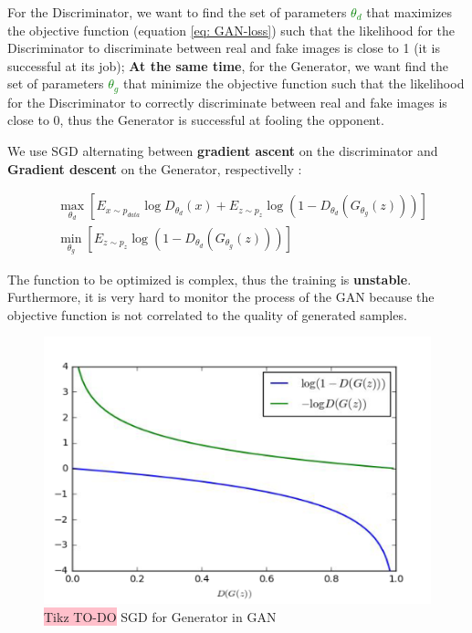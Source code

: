 For the Discriminator, we want to find the set of parameters 
\textcolor{green}{$\theta_{d}$} that maximizes the objective function (equation \ref{eq: GAN-loss}) such that the likelihood for the Discriminator to discriminate between real and fake images is close to 1 (it is successful at its job); \textbf{At the same time}, for the Generator, we want find the set of parameters 
\textcolor{green}{$\theta_{g}$} that minimize the objective function such that the likelihood for the Discriminator to correctly discriminate between real and fake images is close to 0, thus the Generator is successful at fooling the opponent.


We use SGD alternating between \textbf{gradient ascent} on the discriminator and \textbf{Gradient descent} on the Generator, respectivelly :

\begin{equation}
\begin{aligned}
    &\max_{\theta_{d}} \left[E_{x \sim p_{data}} \log D_{\theta_{d}}(x) + E_{z \sim p_{z}} \log (1 - D_{\theta_{d}}(G_{\theta_{g}}(z))) \right] \\
    &\min_{\theta_{g}} \left[E_{z \sim p_{z}} \log (1 - D_{\theta_{d}}(G_{\theta_{g}}(z))) \right]
\end{aligned}
\end{equation}


The function to be optimized is complex, thus the training is \textbf{unstable}. Furthermore, it is very hard to monitor the process of the GAN because the objective function is not correlated to the quality of generated samples.


\begin{figure}[!htbp]
    \centering
    \includegraphics[width=\linewidth]{tikz/SGD GAN.png}
    \caption{{\color{red}\colorbox{pink}{Tikz TO-DO}} SGD for Generator in GAN}
    \label{fig:SGD-GAN}
\end{figure}




